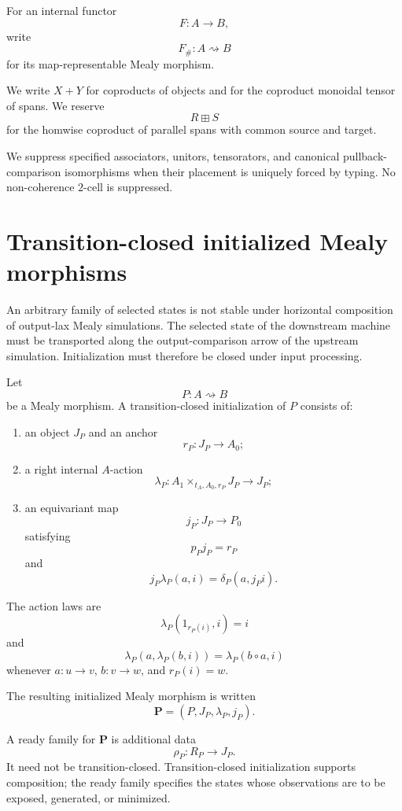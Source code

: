 For an internal functor
\[
  F:A\to B,
\]
write
\[
  F_\#:A\rightsquigarrow B
\]
for its map-representable Mealy morphism.

We write \(X+Y\) for coproducts of objects and for the coproduct monoidal tensor of spans. We reserve
\[
  R\boxplus S
\]
for the homwise coproduct of parallel spans with common source and target.

We suppress specified associators, unitors, tensorators, and canonical pullback-comparison
isomorphisms when their placement is uniquely forced by typing. No non-coherence \(2\)-cell is
suppressed.

\section{Transition-closed initialized Mealy morphisms}
\label{sec:initialized-mealy-morphisms}

An arbitrary family of selected states is not stable under horizontal composition of output-lax
Mealy simulations. The selected state of the downstream machine must be transported along the
output-comparison arrow of the upstream simulation. Initialization must therefore be closed under
input processing.

\begin{definition}
\label{def:transition-closed-initialization}
Let
\[
  P:A\rightsquigarrow B
\]
be a Mealy morphism. A transition-closed initialization of \(P\) consists of:
\begin{enumerate}
  \item an object \(J_P\) and an anchor
  \[
    r_P:J_P\longrightarrow A_0;
  \]
  \item a right internal \(A\)-action
  \[
    \lambda_P:
    A_1\times_{t_A,A_0,r_P}J_P
    \longrightarrow
    J_P;
  \]
  \item an equivariant map
  \[
    j_P:J_P\longrightarrow P_0
  \]
  satisfying
  \[
    p_Pj_P=r_P
  \]
  and
  \[
    j_P\lambda_P(a,i)
    =
    \delta_P(a,j_Pi).
  \]
\end{enumerate}
The action laws are
\[
  \lambda_P(1_{r_P(i)},i)=i
\]
and
\[
  \lambda_P(a,\lambda_P(b,i))
  =
  \lambda_P(b\circ a,i)
\]
whenever \(a:u\to v\), \(b:v\to w\), and \(r_P(i)=w\).

The resulting initialized Mealy morphism is written
\[
  \mathbf P=(P,J_P,\lambda_P,j_P).
\]
\end{definition}

A ready family for \(\mathbf P\) is additional data
\[
  \rho_P:R_P\longrightarrow J_P.
\]
It need not be transition-closed. Transition-closed initialization supports composition; the ready
family specifies the states whose observations are to be exposed, generated, or minimized.

